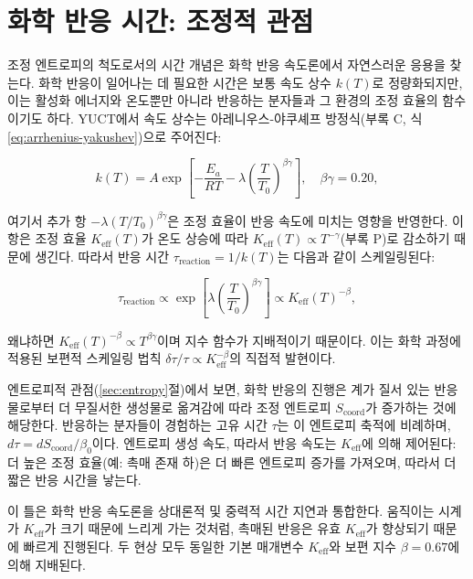 \documentclass[12pt,a4paper]{article}
\newcommand{\Keff}{K_{\mathrm{eff}}}
\newcommand{\Scoord}{S_{\mathrm{coord}}}
\begin{document}
	\section{화학 반응 시간: 조정적 관점}
	\label{sec:chemistry}
	
	조정 엔트로피의 척도로서의 시간 개념은 화학 반응 속도론에서 자연스러운 응용을 찾는다. 화학 반응이 일어나는 데 필요한 시간은 보통 속도 상수 \(k(T)\)로 정량화되지만, 이는 활성화 에너지와 온도뿐만 아니라 반응하는 분자들과 그 환경의 조정 효율의 함수이기도 하다. YUCT에서 속도 상수는 아레니우스-야쿠셰프 방정식(부록 C, 식 \ref{eq:arrhenius-yakushev})으로 주어진다:
	
	\begin{equation}
		k(T) = A \exp\left[-\frac{E_a}{RT} - \lambda \left(\frac{T}{T_0}\right)^{\beta\gamma}\right], \quad \beta\gamma = 0.20,
	\end{equation}
	
	여기서 추가 항 \(-\lambda (T/T_0)^{\beta\gamma}\)은 조정 효율이 반응 속도에 미치는 영향을 반영한다. 이 항은 조정 효율 \(\Keff(T)\)가 온도 상승에 따라 \(\Keff(T) \propto T^{-\gamma}\)(부록 P)로 감소하기 때문에 생긴다. 따라서 반응 시간 \(\tau_{\mathrm{reaction}} = 1/k(T)\)는 다음과 같이 스케일링된다:
	
	\begin{equation}
		\tau_{\mathrm{reaction}} \propto \exp\left[\lambda \left(\frac{T}{T_0}\right)^{\beta\gamma}\right] \propto \Keff(T)^{-\beta},
	\end{equation}
	
	왜냐하면 \(\Keff(T)^{-\beta} \propto T^{\beta\gamma}\)이며 지수 함수가 지배적이기 때문이다. 이는 화학 과정에 적용된 보편적 스케일링 법칙 \(\delta \tau / \tau \propto \Keff^{-\beta}\)의 직접적 발현이다.
	
	엔트로피적 관점(\ref{sec:entropy}절)에서 보면, 화학 반응의 진행은 계가 질서 있는 반응물로부터 더 무질서한 생성물로 옮겨감에 따라 조정 엔트로피 \(\Scoord\)가 증가하는 것에 해당한다. 반응하는 분자들이 경험하는 고유 시간 \(\tau\)는 이 엔트로피 축적에 비례하며, \(d\tau = d\Scoord / \beta_0\)이다. 엔트로피 생성 속도, 따라서 반응 속도는 \(\Keff\)에 의해 제어된다: 더 높은 조정 효율(예: 촉매 존재 하)은 더 빠른 엔트로피 증가를 가져오며, 따라서 더 짧은 반응 시간을 낳는다.
	
	이 틀은 화학 반응 속도론을 상대론적 및 중력적 시간 지연과 통합한다. 움직이는 시계가 \(\Keff\)가 크기 때문에 느리게 가는 것처럼, 촉매된 반응은 유효 \(\Keff\)가 향상되기 때문에 빠르게 진행된다. 두 현상 모두 동일한 기본 매개변수 \(\Keff\)와 보편 지수 \(\beta = 0.67\)에 의해 지배된다.
	
\end{document}
